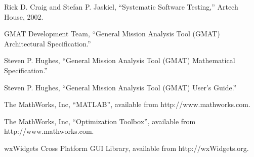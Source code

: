 \documentclass[letterpaper,10pt]{book}
\begin{document}
\begin{thebibliography}{poseidon} %

 Rick D. Craig and Stefan P. Jaskiel, ``Systematic Software Testing,'' Artech
House, 2002.

 GMAT Development Team, ``General Mission Analysis Tool (GMAT) Architectural
Specification.''

 Steven P. Hughes, ``General Mission Analysis Tool (GMAT) Mathematical
Specification.''

 Steven P. Hughes, ``General Mission Analysis Tool (GMAT) User's Guide.''

 The MathWorks, Inc, ``MATLAB'', available from http://www.mathworks.com.

 The MathWorks, Inc, ``Optimization Toolbox'', available from
http://www.mathworks.com.

 wxWidgets Cross Platform GUI Library, available from http://wxWidgets.org.

\end{thebibliography}
\end{document}
